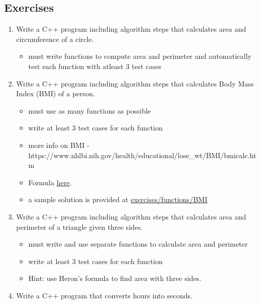 \documentclass[11pt]{article}
\providecommand{\tightlist}{%
      \setlength{\itemsep}{0pt}\setlength{\parskip}{0pt}}
\begin{document}
    \hypertarget{exercises}{%
\subsection{Exercises}\label{exercises}}

\begin{enumerate}
\def\labelenumi{\arabic{enumi}.}
\tightlist
\item
  Write a C++ program including algorithm steps that calculates area and
  circumference of a circle.

  \begin{itemize}
  \tightlist
  \item
    must write functions to compute area and perimeter and automatically
    test each function with atleast 3 test cases
  \end{itemize}
\item
  Write a C++ program including algorithm steps that calculates Body
  Mass Index (BMI) of a person.

  \begin{itemize}
  \tightlist
  \item
    must use as many functions as possible
  \item
    write at least 3 test cases for each function
  \item
    more info on BMI -
    https://www.nhlbi.nih.gov/health/educational/lose\_wt/BMI/bmicalc.htm
  \item
    Formula
    \href{https://www.cdc.gov/healthyweight/assessing/bmi/childrens_bmi/childrens_bmi_formula.html\#:~:text=The\%20formula\%20for\%20BMI\%20is,to\%20convert\%20this\%20to\%20meters.\&text=When\%20using\%20English\%20measurements\%2C\%20pounds\%20should\%20be\%20divided\%20by\%20inches\%20squared}{here}.
  \item
    a sample solution is provided at \url{exercises/functions/BMI}
  \end{itemize}
\item
  Write a C++ program including algorithm steps that calculates area and
  perimeter of a triangle given three sides.

  \begin{itemize}
  \tightlist
  \item
    must write and use separate functions to calculate area and
    perimeter
  \item
    write at least 3 test cases for each function
  \item
    Hint: use Heron's formula to find area with three sides.
  \end{itemize}
\item
  Write a C++ program that converts hours into seconds.


\end{enumerate}
\end{document}
